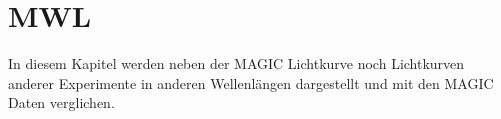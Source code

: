 \chapter{MWL}
In diesem Kapitel werden neben der MAGIC Lichtkurve noch Lichtkurven anderer Experimente in anderen Wellenlängen dargestellt und mit den MAGIC Daten verglichen.
